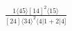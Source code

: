 \documentclass[varwidth, border=5pt]{standalone}
\begin{document}
\begin{my}
$\begin{gathered}
\scriptscriptstyle\frac{1⟨45⟩[14]^2⟨15⟩}{[24]⟨34⟩^2⟨4|1+2|4]}
\end{gathered}$
\end{my}
\end{document}
